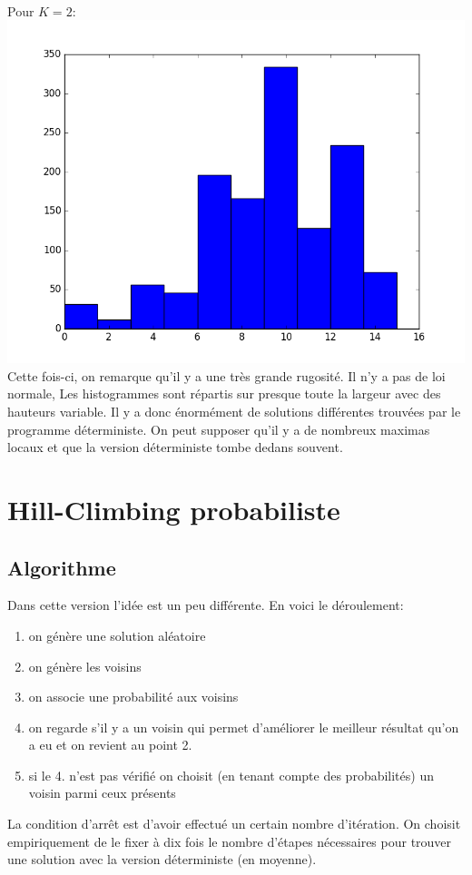 \documentclass[a4paper, 11pt]{article}
\begin{document}
\paragraph{}
Pour $K=2$:\\
\includegraphics[scale=0.5]{d_d_2}
\\
Cette fois-ci, on remarque qu'il y a une très grande rugosité. Il n'y a pas de loi normale, Les histogrammes sont répartis sur presque 
toute la largeur avec des hauteurs variable. Il y a donc énormément de solutions différentes trouvées par le programme déterministe.
On peut supposer qu'il y a de nombreux maximas locaux et que la version déterministe tombe dedans souvent.

\section{Hill-Climbing probabiliste}
\subsection{Algorithme}
Dans cette version l'idée est un peu différente. En voici le déroulement:
\begin{enumerate}
 \item on génère une solution aléatoire
 \item on génère les voisins
 \item on associe une probabilité aux voisins
 \item on regarde s'il y a un voisin qui permet d'améliorer le meilleur résultat qu'on a eu et on revient au point 2.
 \item si le 4. n'est pas vérifié on choisit (en tenant compte des probabilités) un voisin parmi ceux présents
\end{enumerate}
La condition d'arrêt est d'avoir effectué un certain nombre d'itération. On choisit empiriquement de le fixer à dix fois le nombre
d'étapes nécessaires pour trouver une solution avec la version déterministe (en moyenne).
\end{document}
